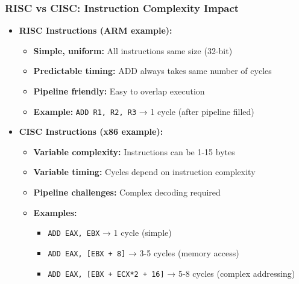 \begin{frame}
\frametitle{RISC vs CISC: Instruction Complexity Impact}
\begin{itemize}
    \item \textbf{RISC Instructions (ARM example):}
    \begin{itemize}
        \item \textbf{Simple, uniform:} All instructions same size (32-bit)
        \item \textbf{Predictable timing:} ADD always takes same number of cycles
        \item \textbf{Pipeline friendly:} Easy to overlap execution
        \item \textbf{Example:} \texttt{ADD R1, R2, R3} → 1 cycle (after pipeline filled)
    \end{itemize}
    \item \textbf{CISC Instructions (x86 example):}
    \begin{itemize}
        \item \textbf{Variable complexity:} Instructions can be 1-15 bytes
        \item \textbf{Variable timing:} Cycles depend on instruction complexity
        \item \textbf{Pipeline challenges:} Complex decoding required
        \item \textbf{Examples:}
        \begin{itemize}
            \item \texttt{ADD EAX, EBX} → 1 cycle (simple)
            \item \texttt{ADD EAX, [EBX + 8]} → 3-5 cycles (memory access)
            \item \texttt{ADD EAX, [EBX + ECX*2 + 16]} → 5-8 cycles (complex addressing)
        \end{itemize}
    \end{itemize}
\end{itemize}
\end{frame}

